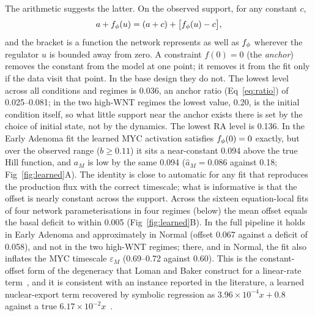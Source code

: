 The arithmetic suggests the latter. On the observed support, for any constant
$c$,
\begin{equation}
a + f_{\phi}(u) = (a + c) + \big[f_{\phi}(u) - c\big],
\label{eq:compensation}
\end{equation}
and the bracket is a function the network represents as well as $f_{\phi}$
wherever the regulator $u$ is bounded away from zero. A constraint $f(0)=0$ (the
\emph{anchor}) removes the constant from the model at one point; it removes it
from the fit only if the data visit that point. In the base design they do not.
The lowest \bcat{} level across all conditions and regimes is 0.036, an anchor
ratio (Eq~\eqref{eq:ratio}) of 0.025--0.081; in the two high-WNT regimes the
lowest value, 0.20, is the initial condition itself, so what little support
near the anchor exists there is set by the choice of initial state, not by the
dynamics. The lowest RA level is 0.136. In the Early Adenoma fit the learned MYC
activation satisfies $f_{\phi}(0)=0$ exactly, but over the observed range
($b\ge0.11$) it sits a near-constant 0.094 above the true Hill function, and
$a_M$ is low by the same 0.094 ($\hat a_M=0.086$ against 0.18;
Fig~\ref{fig:learned}A). The identity is close to automatic for any fit that
reproduces the production flux with the correct timescale; what is informative
is that the offset is nearly constant across the support. Across the sixteen
equation-local fits of four network parameterisations in four regimes (below)
the mean offset equals the basal deficit to within 0.005
(Fig~\ref{fig:learned}B). In the full pipeline it holds in Early Adenoma and
approximately in Normal (offset 0.067 against a deficit of 0.058), and not in
the two high-WNT regimes; there, and in Normal, the fit also inflates the MYC
timescale $\varepsilon_M$ (0.69--0.72 against 0.60). This is the
constant-offset form of the degeneracy that Loman and Baker construct for a
linear-rate term~\citep{loman2025identifiability}, and it is consistent with an
instance reported in the literature, a learned nuclear-export term recovered
by symbolic regression as $3.96\times10^{-4}x+0.8$ against a true
$6.17\times10^{-2}x$~\citep{philipps2025ude}.

